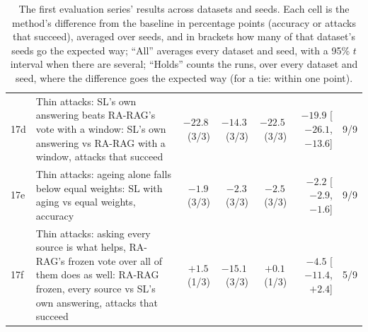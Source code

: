 \begin{landscape}
\begin{table}
\begin{tabular}{@{}l p{12.4cm} rrr r c@{}}
17d & Thin attacks: SL's own answering beats RA-RAG's vote with a window: SL's own answering vs RA-RAG with a window, attacks that succeed & $-22.8$\,{\scriptsize(3/3)} & $-14.3$\,{\scriptsize(3/3)} & $-22.5$\,{\scriptsize(3/3)} & $-19.9$ [$-26.1$, $-13.6$] & 9/9 \\
17e & Thin attacks: ageing alone falls below equal weights: SL with aging vs equal weights, accuracy & $-1.9$\,{\scriptsize(3/3)} & $-2.3$\,{\scriptsize(3/3)} & $-2.5$\,{\scriptsize(3/3)} & $-2.2$ [$-2.9$, $-1.6$] & 9/9 \\
17f & Thin attacks: asking every source is what helps, RA-RAG's frozen vote over all of them does as well: RA-RAG frozen, every source vs SL's own answering, attacks that succeed & $+1.5$\,{\scriptsize(1/3)} & $-15.1$\,{\scriptsize(3/3)} & $+0.1$\,{\scriptsize(1/3)} & $-4.5$ [$-11.4$, $+2.4$] & 5/9 \\
\bottomrule
\end{tabular}
\caption{The first evaluation series' results across datasets and seeds. Each cell is the method's difference from the baseline in percentage points (accuracy or attacks that succeed), averaged over seeds, and in brackets how many of that dataset's seeds go the expected way; ``All'' averages every dataset and seed, with a 95\% $t$ interval when there are several; ``Holds'' counts the runs, over every dataset and seed, where the difference goes the expected way (for a tie: within one point).}
\label{tab:claims}
\end{table}
\end{landscape}
